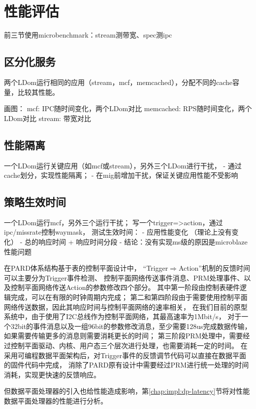 \section{性能评估}

前三节使用microbenchmark：stream测带宽、spec测ipc

\subsection{区分化服务}

两个LDom运行相同的应用（stream，mcf，memcached），分配不同的cache容量，比较其性能。

画图：
 mcf: IPC随时间变化，两个LDom对比
 memcached: RPS随时间变化，两个LDom对比
 stream: 带宽对比

\subsection{性能隔离}

一个LDom运行关键应用（如mcf或stream），另外三个LDom进行干扰，
 - 通过cache划分，实现性能隔离；
 - 在mig前增加干扰，保证关键应用性能不受影响

\subsection{策略生效时间}
\label{chap:impl:trigger-latency}

一个LDom运行mcf，另外三个运行干扰；
写一个trigger=>action，通过ipc/missrate控制waymask，
测试生效时间：
 - 应用性能变化 （理论上没有变化）
 - 总的响应时间 + 响应时间分段
 - 结论：没有实现ms级的原因是microblaze性能问题

在PARD体系结构基于表的控制平面设计中，
``Trigger$\Rightarrow$Action''机制的反馈时间可以主要分为Trigger事件检测、
控制平面网络传送事件消息、PRM处理事件、以及控制平面网络传送Action的参数修改四个部分。
其中第一阶段由控制表硬件逻辑完成，可以在有限的时钟周期内完成；
第二和第四阶段由于需要使用控制平面网络传送数据，因此其响应时间与控制平面网络的速率相关，
在我们目前的原型系统中，由于使用了I2C总线作为控制平面网络，其最高速率为1Mbit/s，
对于一个32bit的事件消息以及一组96bit的参数修改消息，至少需要128us完成数据传输，
如果需要传输更多的消息则需要消耗更长的时间；
第三阶段PRM处理中，需要经过控制平面驱动、内核、用户态三个层次进行处理，也需要消耗一定的时间。
在采用可编程数据平面架构后，对Trigger事件的反馈调节代码可以直接在数据平面的固件代码中完成，
消除了PARD原有设计中需要经过PRM进行统一处理的时间消耗，实现更快速的反馈响应。

但数据平面处理器的引入也给性能造成影响，第\ref{chap:impl:dp-latency}节将对性能数据平面处理器的性能进行分析。

